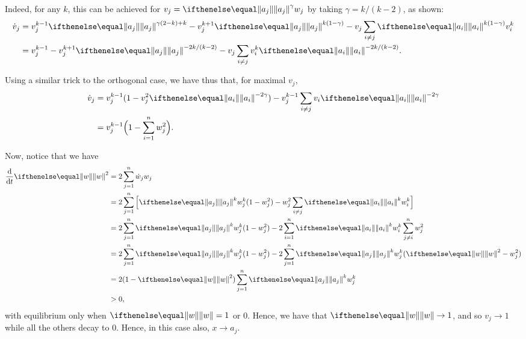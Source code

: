 \documentclass{hw-scrartcl}
\begin{document}
Indeed, for any \(k\), this can be achieved for \(v_j = \norm{a_j}^\gamma w_j\) by taking \(\gamma = k/(k-2)\), as shown:
\begin{align*}
  \dot{v}_j
  &= v_j^{k-1} \norm{a_j}^{\gamma(2-k) + k} - v_j^{k+1} \norm{a_j}^{k(1-\gamma)} - v_j \sum_{i \neq j} \norm{a_i}^{k(1-\gamma)} v_i^k \\
  &= v_j^{k-1}  - v_j^{k+1}\norm{a_j}^{-2k/(k-2)} - v_j \sum_{i\neq j} v_i^k \norm{a_i}^{-2k/(k-2)}.
\end{align*}

Using a similar trick to the orthogonal case, we have thus that, for maximal \(v_j\),
\begin{align*}
  \dot{v}_j
  &= v_j^{k-1}(1 - v_j^2 \norm{a_i}^{-2\gamma}) - v_j^{k-1} \sum_{i\neq j} v_i \norm{a_i}^{-2\gamma} \\
  &= v_j^{k-1} \Big(1 - \sum_{i=1}^n w_j^2\Big).
\end{align*}

Now, notice that we have
\begin{align*}
  \deriv{}{t} \norm{w}^2
  &= 2\sum_{j=1}^n \dot{w}_j w_j \\
  &= 2\sum_{j=1}^n \Big[\norm{a_j}^k w_j^k(1 - w_j^2) - w_j^2 \sum_{i\neq j} \norm{a_i}^k w_i^k\Big] \\
  &= 2\sum_{j=1}^n \norm{a_j}^k w_j^k(1 - w_j^2) - 2\sum_{i=1}^n \norm{a_i}^k w_i^k \sum_{j\neq i}^n w_j^2 \\
  &= 2\sum_{j=1}^n \norm{a_j}^k w_j^k(1 - w_j^2) - 2\sum_{j=1}^n \norm{a_j}^k w_j^k(\norm{w}^2 - w_j^2) \\
  &= 2(1 - \norm{w}^2)\sum_{j=1}^n \norm{a_j}^k w_j^k \\
  &>0,
\end{align*}
with equilibrium only when \(\norm{w} = 1\) or \(0\). Hence, we have that \(\norm{w} \rightarrow 1\), and so \(v_j \rightarrow 1\) while all the others decay to \(0\). Hence, in this case also, \(x\rightarrow a_j\).
\end{document}
